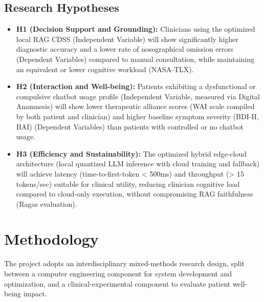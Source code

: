 \documentclass[11pt,a4paper]{article}
\begin{document}
\subsection{Research Hypotheses}
\begin{itemize}
    \item \textbf{H1 (Decision Support and Grounding):} Clinicians using the optimized local RAG CDSS (Independent Variable) will show significantly higher diagnostic accuracy and a lower rate of nosographical omission errors (Dependent Variables) compared to manual consultation, while maintaining an equivalent or lower cognitive workload (NASA-TLX).
    \item \textbf{H2 (Interaction and Well-being):} Patients exhibiting a dysfunctional or compulsive chatbot usage profile (Independent Variable, measured via Digital Anamnesis) will show lower therapeutic alliance scores (WAI scale compiled by both patient and clinician) and higher baseline symptom severity (BDI-II, BAI) (Dependent Variables) than patients with controlled or no chatbot usage.
    \item \textbf{H3 (Efficiency and Sustainability):} The optimized hybrid edge-cloud architecture (local quantized LLM inference with cloud training and fallback) will achieve latency (time-to-first-token < 500ms) and throughput (> 15 tokens/sec) suitable for clinical utility, reducing clinician cognitive load compared to cloud-only execution, without compromising RAG faithfulness (Ragas evaluation).
\end{itemize}

\section{Methodology}

The project adopts an interdisciplinary mixed-methods research design, split between a computer engineering component for system development and optimization, and a clinical-experimental component to evaluate patient well-being impact.
\end{document}
